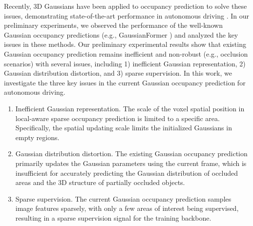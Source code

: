 \documentclass[journal]{IEEEtran}
\begin{document}
Recently, 3D Gaussians have been applied to occupancy prediction to solve these issues, demonstrating state-of-the-art performance in autonomous driving \cite{huang2024gaussianformer,zuo2024gaussianworld,sun2024gsrender,zhou2025occgs}.
In our preliminary experiments, we observed the performance of the well-known Gaussian occupancy predictions (e.g., GaussianFormer \cite{huang2024gaussianformer}) and analyzed the key issues in these methods. 
Our preliminary experimental results show that existing Gaussian occupancy prediction remains inefficient and non-robust (e.g., occlusion scenarios) with several issues, including 1) inefficient Gaussian representation, 2) Gaussian distribution distortion, and 3) sparse supervision.
In this work, we investigate the three key issues in the current Gaussian occupancy prediction for autonomous driving.
\begin{enumerate} [noitemsep,leftmargin=*,topsep=0pt]
    \item Inefficient Gaussian representation. The scale of the voxel spatial position in local-aware sparse occupancy prediction is limited to a specific area.
    Specifically, the spatial updating scale limits the initialized Gaussians in empty regions.
    \item Gaussian distribution distortion. The existing Gaussian occupancy prediction primarily updates the Gaussian parameters using the current frame, which is insufficient for accurately predicting the Gaussian distribution of occluded areas and the 3D structure of partially occluded objects.
    \item Sparse supervision. The current Gaussian occupancy prediction samples image features sparsely, with only a few areas of interest being supervised, resulting in a sparse supervision signal for the training backbone.
\end{enumerate}
\end{document}
